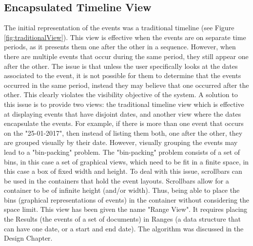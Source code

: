 \subsection{Encapsulated Timeline View}
\par The initial representation of the events was a traditional timeline (see Figure \ref{fig:traditionalView}). This view is effective when the events are on separate time periods, as it presents them one after the other in a sequence. However, when there are multiple events that occur during the same period, they still appear one after the other. The issue is that unless the user specifically looks at the dates associated to the event, it is not possible for them to determine that the events occurred in the same period, instead they may believe that one occurred after the other. This clearly violates the visibility objective of the system. A solution to this issue is to provide two views: the traditional timeline view which is effective at displaying events that have disjoint dates, and another view where the dates encapsulate the events. For example, if there is more than one event that occurs on the "25-01-2017", then instead of listing them both, one after the other, they are grouped visually by their date. However, visually grouping the events may lead to a "bin-packing" problem. The "bin-packing" problem consists of a set of bins, in this case a set of graphical views, which need to be fit in a finite space, in this case a box of fixed width and height. To deal with this issue, scrollbars can be used in the containers that hold the event layouts. Scrollbars allow for a container to be of infinite height (and/or width). Thus, being able to place the bins (graphical representations of events) in the container without considering the space limit. This view has been given the name "Range View". It requires placing the Results (the events of a set of documents) in Ranges (a data structure that can have one date, or a start and end date). The algorithm was discussed in the Design Chapter.

